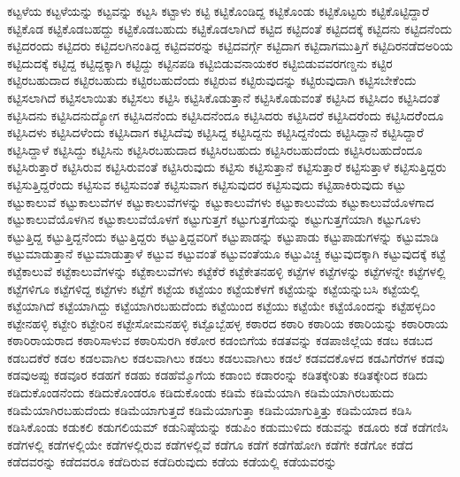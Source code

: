 {ಕಟ್ಟಳೆಯ
ಕಟ್ಟಳೆಯನ್ನು
ಕಟ್ಟವನ್ನು
ಕಟ್ಟಸಿ
ಕಟ್ಟಾಳು
ಕಟ್ಟಿ
ಕಟ್ಟಿಕೊಂಡಿದ್ದ
ಕಟ್ಟಿಕೊಂಡು
ಕಟ್ಟಿಕೊಟ್ಟರು
ಕಟ್ಟಿಕೊಟ್ಟಿದ್ದಾರೆ
ಕಟ್ಟಿಕೊಡ
ಕಟ್ಟಿಕೊಡಬಹದ್ದು
ಕಟ್ಟಿಕೊಡಬಹುದು
ಕಟ್ಟಿಕೊಡಲಾಗಿದೆ
ಕಟ್ಟಿದ
ಕಟ್ಟಿದಂತೆ
ಕಟ್ಟಿದದಕ್ಕೆ
ಕಟ್ಟಿದನು
ಕಟ್ಟಿದನೆಂದು
ಕಟ್ಟಿದರಂದು
ಕಟ್ಟಿದರು
ಕಟ್ಟಿದಲಗಿನಂತಿದ್ದ
ಕಟ್ಟಿದವರನ್ನು
ಕಟ್ಟಿದವರ್ಗ್ಗೆ
ಕಟ್ಟಿದಾಗ
ಕಟ್ಟಿದಾಗಮುತ್ತಿಗೆ
ಕಟ್ಟಿದಿರನಡೆದಅರಿಯ
ಕಟ್ಟಿದುದಕ್ಕೆ
ಕಟ್ಟಿದ್ದ
ಕಟ್ಟಿದ್ದಕ್ಕಾಗಿ
ಕಟ್ಟಿದ್ದು
ಕಟ್ಟಿನಪಡಿ
ಕಟ್ಟಿಬಿಡುವನಾಯಕರ
ಕಟ್ಟಿಬಿಡುವವರಗಣ್ಡನು
ಕಟ್ಟಿರ
ಕಟ್ಟಿರಬಹುದಾದ
ಕಟ್ಟಿರಬಹುದು
ಕಟ್ಟಿರಬಹುದೆಂದು
ಕಟ್ಟಿರುವ
ಕಟ್ಟಿರುವುದನ್ನು
ಕಟ್ಟಿರುವುದಾಗಿ
ಕಟ್ಟಿಸಬೇಕೆಂದು
ಕಟ್ಟಿಸಲಾಗಿದೆ
ಕಟ್ಟಿಸಲಾಯಿತು
ಕಟ್ಟಿಸಲು
ಕಟ್ಟಿಸಿ
ಕಟ್ಟಿಸಿಕೊಡುತ್ತಾನೆ
ಕಟ್ಟಿಸಿಕೊಡುವಂತೆ
ಕಟ್ಟಿಸಿದ
ಕಟ್ಟಿಸಿದಂ
ಕಟ್ಟಿಸಿದಂತೆ
ಕಟ್ಟಿಸಿದನು
ಕಟ್ಟಿಸಿದನುದ್ಯೋಗ
ಕಟ್ಟಿಸಿದನೆಂದು
ಕಟ್ಟಿಸಿದನೆಂದೂ
ಕಟ್ಟಿಸಿದರು
ಕಟ್ಟಿಸಿದರೆ
ಕಟ್ಟಿಸಿದರೆಂದು
ಕಟ್ಟಿಸಿದರೆೆಂದೂ
ಕಟ್ಟಿಸಿದಳು
ಕಟ್ಟಿಸಿದಳೆಂದು
ಕಟ್ಟಿಸಿದಾಗ
ಕಟ್ಟಿಸಿದೆವು
ಕಟ್ಟಿಸಿದ್ದ
ಕಟ್ಟಿಸಿದ್ದನು
ಕಟ್ಟಿಸಿದ್ದನೆಂದು
ಕಟ್ಟಿಸಿದ್ದಾನೆ
ಕಟ್ಟಿಸಿದ್ದಾರೆ
ಕಟ್ಟಿಸಿದ್ದಾಳೆ
ಕಟ್ಟಿಸಿದ್ದು
ಕಟ್ಟಿಸಿನು
ಕಟ್ಟಿಸಿರಬಹುದಾದ
ಕಟ್ಟಿಸಿರಬಹುದು
ಕಟ್ಟಿಸಿರಬಹುದೆಂದು
ಕಟ್ಟಿಸಿರಬಹುದೆಂದೂ
ಕಟ್ಟಿಸಿರುತ್ತಾರೆ
ಕಟ್ಟಿಸಿರುವ
ಕಟ್ಟಿಸಿರುವಂತೆ
ಕಟ್ಟಿಸಿರುವುದು
ಕಟ್ಟಿಸು
ಕಟ್ಟಿಸುತ್ತಾನೆ
ಕಟ್ಟಿಸುತ್ತಾರೆ
ಕಟ್ಟಿಸುತ್ತಾಳೆ
ಕಟ್ಟಿಸುತ್ತಿದ್ದರು
ಕಟ್ಟಿಸುತ್ತಿದ್ದರೆಂದು
ಕಟ್ಟಿಸುವ
ಕಟ್ಟಿಸುವಂತೆ
ಕಟ್ಟಿಸುವಾಗ
ಕಟ್ಟಿಸುವುದರ
ಕಟ್ಟಿಸುವುದು
ಕಟ್ಟಿಹಾಕಿರುವುದು
ಕಟ್ಟು
ಕಟ್ಟುಕಾಲುವೆ
ಕಟ್ಟುಕಾಲುವೆಗಳ
ಕಟ್ಟುಕಾಲುವೆಗಳನ್ನು
ಕಟ್ಟುಕಾಲುವೆಗಳು
ಕಟ್ಟುಕಾಲುವೆಯ
ಕಟ್ಟುಕಾಲುವೆಯೊಳಗಾದ
ಕಟ್ಟುಕಾಲುವೆಯೊಳಗಿನ
ಕಟ್ಟುಕಾಲುವೆಯೊಳಗೆ
ಕಟ್ಟುಗುತ್ತಗೆ
ಕಟ್ಟುಗುತ್ತಗೆಯನ್ನು
ಕಟ್ಟುಗುತ್ತಗೆಯಾಗಿ
ಕಟ್ಟುಗೂಳು
ಕಟ್ಟುತ್ತಿದ್ದ
ಕಟ್ಟುತ್ತಿದ್ದನೆಂದು
ಕಟ್ಟುತ್ತಿದ್ದರು
ಕಟ್ಟುತ್ತಿದ್ದವರಿಗೆ
ಕಟ್ಟುಪಾಡನ್ನು
ಕಟ್ಟುಪಾಡು
ಕಟ್ಟುಪಾಡುಗಳನ್ನು
ಕಟ್ಟುಮಾಡಿ
ಕಟ್ಟುಮಾಡುತ್ತಾನೆ
ಕಟ್ಟುಮಾಡುತ್ತಾಳೆ
ಕಟ್ಟುವ
ಕಟ್ಟುವಂತೆ
ಕಟ್ಟುವಂತೆಯೂ
ಕಟ್ಟುವಿಚ್ಚ
ಕಟ್ಟುವುದಕ್ಕಾಗಿ
ಕಟ್ಟುವುದಕ್ಕೆ
ಕಟ್ಟೆ
ಕಟ್ಟೆಕಾಲುವೆ
ಕಟ್ಟೆಕಾಲುವೆಗಳನ್ನು
ಕಟ್ಟೆಕಾಲುವೆಗಳು
ಕಟ್ಟೆಕೆರೆ
ಕಟ್ಟೆಕೇತನಹಳ್ಳಿ
ಕಟ್ಟೆಗಳ
ಕಟ್ಟೆಗಳನ್ನು
ಕಟ್ಟೆಗಳನ್ನೇ
ಕಟ್ಟೆಗಳಲ್ಲಿ
ಕಟ್ಟೆಗಳಿಗೂ
ಕಟ್ಟೆಗಳಿದ್ದ
ಕಟ್ಟೆಗಳು
ಕಟ್ಟೆಗೆ
ಕಟ್ಟೆಯ
ಕಟ್ಟೆಯಂ
ಕಟ್ಟೆಯಕೆಳಗೆ
ಕಟ್ಟೆಯನ್ನು
ಕಟ್ಟೆಯನ್ನುಬಸಿ
ಕಟ್ಟೆಯಲ್ಲಿ
ಕಟ್ಟೆಯಾಗಿದೆ
ಕಟ್ಟೆಯಾಗಿದ್ದು
ಕಟ್ಟೆಯಾಗಿರಬಹುದೆಂದು
ಕಟ್ಟೆಯಿಂದ
ಕಟ್ಟೆಯು
ಕಟ್ಟೆಯೇ
ಕಟ್ಟೆಯೊಂದನ್ನು
ಕಟ್ಟೆಹಳ್ಳದಿಂ
ಕಟ್ಟೇನಹಳ್ಳಿ
ಕಟ್ಟೇರಿ
ಕಟ್ಟೇರಿನ
ಕಟ್ಟೇಸೋಮನಹಳ್ಳಿ
ಕಟ್ಟೊಬ್ಬೆಹಳ್ಳ
ಕಠಾರದ
ಕಠಾರಿ
ಕಠಾರಿಯ
ಕಠಾರಿಯನ್ನು
ಕಠಾರಿರಾಯ
ಕಠಾರಿರಾಯರಾದ
ಕಠಾರಿಸಾಳುವ
ಕಠಾರಿಸುರಗಿ
ಕಠೋರ
ಕಡಂಬಿಗೆಯ
ಕಡತವನ್ನು
ಕಡಪಾಜಿಲ್ಲೆಯ
ಕಡಬ
ಕಡಬದ
ಕಡಬದಕೆರೆ
ಕಡಲ
ಕಡಲವಾಗಿಲ
ಕಡಲವಾಗಿಲು
ಕಡಲು
ಕಡಲುವಾಗಿಲು
ಕಡಲೆ
ಕಡವದಕೊಳದ
ಕಡವಿಗೆರೆಗಳ
ಕಡವು
ಕಡವುಅಪ್ಪು
ಕಡವೂರ
ಕಡಹಗೆ
ಕಡಹು
ಕಡಹೆಮ್ಮೊಗೆಯ
ಕಡಾಂಬಿ
ಕಡಾರಂನ್ನು
ಕಡಿತಕ್ಕೇರಿತು
ಕಡಿತಕ್ಕೇರಿದ
ಕಡಿದು
ಕಡಿದುಕೊಂಡನೆಂದು
ಕಡಿದುಕೊಂಡರೂ
ಕಡಿದುಕೊಂಡು
ಕಡಿಮೆ
ಕಡಿಮೆಯಾಗಿ
ಕಡಿಮೆಯಾಗಿರಬಹುದು
ಕಡಿಮೆಯಾಗಿರಬಹುದೆಂದು
ಕಡಿಮೆಯಾಗುತ್ತದೆ
ಕಡಿಮೆಯಾಗುತ್ತಾ
ಕಡಿಮೆಯಾಗುತ್ತಿತ್ತು
ಕಡಿಮೆಯಾದ
ಕಡಿಸಿ
ಕಡಿಸಿಕೊಂಡು
ಕಡುಕಲಿ
ಕಡುಗಲಿಯಮ್
ಕಡುನಿಷ್ಠೆಯನ್ನು
ಕಡುಪಿಂ
ಕಡುಮುಳಿದು
ಕಡುವನ್ನು
ಕಡೂರು
ಕಡೆ
ಕಡೆಗಣಿಸಿ
ಕಡೆಗಳಲ್ಲಿ
ಕಡೆಗಳಲ್ಲಿಯೇ
ಕಡೆಗಳಲ್ಲಿರುವ
ಕಡೆಗಳಲ್ಲಿವೆ
ಕಡೆಗೂ
ಕಡೆಗೆ
ಕಡೆಗೆಹೋಗಿ
ಕಡೆಗೇ
ಕಡೆಗೋ
ಕಡೆದ
ಕಡೆದವರನ್ನು
ಕಡೆದವರೂ
ಕಡೆದಿರುವ
ಕಡೆದಿರುವುದು
ಕಡೆಯ
ಕಡೆಯಲ್ಲಿ
ಕಡೆಯವರನ್ನು
}
